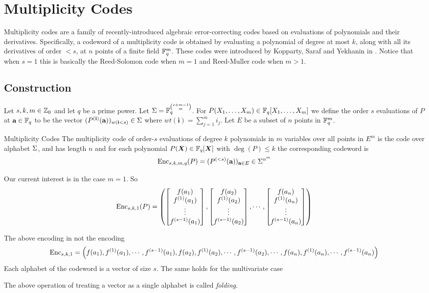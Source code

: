 \section{Multiplicity Codes}
Multiplicity codes are a family of recently-introduced algebraic error-correcting codes based on evaluations of polynomials and their derivatives. Specifically, a codeword of a multiplicity code is obtained by evaluating a polynomial of degree at most $k$, along with all its derivatives of order $<s$, at $n$ points of a finite field $\mathbb{F}_q^m$. These codes were introduced by Kopparty, Saraf and Yekhanin in \cite{KoppartySarafYekhanin_2014_Hrc}. Notice that when $s=1$ this is basically the Reed-Solomon code when $m=1$ and Reed-Muller code when $m>1$.
\subsection{Construction}
Let $s,k,m\in \mathbb{Z}_0$ and let $q$ be a prime power. Let $\Sigma= \mathbb{F}_q^{\binom{s+m-1}{m}}$. For $P(X_1,\dots, X_m)\in \mathbb{F}_q[X_1,\dots, X_m]$ we define the order $s$ evaluations of $P$ at $\textbf{a}\in \mathbb{F}_q$ to be the vector $(P^{(\textbf{i})}(\textbf{a}))_{w(\textbf{i}<s)}\in \Sigma$ where $wt(\textbf{i})=\sum\limits_{j=1}^m i_j$. Let $E$ be a subset of $n$ points in $\mathbb{F}_q^m$.  
\begin{Definition}{Multiplicity Codes}{}
    The multiplicity code of order-$s$ evaluations of degree $k$ polynomials in $m$ variables over all points in $E^m$ is the code over alphabet $\Sigma$, and has length $n$ and for each polynomial $P(\boldsymbol{X})\in \mathbb{F}_q[\boldsymbol{X}]$ with $\deg(P)\leq k$ the corresponding codeword is $$\operatorname{Enc}_{s,k,m,q}(P)=(P^{(<s)}(\textbf{a}))_{\textbf{a}\in E}\in\Sigma^{n^m}$$
\end{Definition}


Our current interest is in the case $m=1$. So $$\operatorname{Enc}_{s,k,1}(P)=\left(\left[\begin{matrix}f(a_1)\\ f^{(1)}(a_1)\\ \vdots\\ f^{(s-1)}(a_1)\end{matrix}\right],\left[\begin{matrix}f(a_2)\\ f^{(1)}(a_2)\\ \vdots\\ f^{(s-1)}(a_2)\end{matrix}\right],\cdots, \left[\begin{matrix}f(a_n)\\ f^{(1)}(a_n)\\ \vdots\\ f^{(s-1)}(a_n)\end{matrix}\right]\right)$$

\begin{remark}
    The above encoding in not the encoding $$\operatorname{Enc}_{s,k,1}=\left({f(a_1), f^{(1)}(a_1), \cdots, f^{(s-1)}(a_1)},{f(a_2), f^{(1)}(a_2), \cdots, f^{(s-1)}(a_2)},\cdots, {f(a_n), f^{(1)}(a_n), \cdots, f^{(s-1)}(a_n)}\right)$$Each alphabet of the codeword is a vector of size $s$. The same holds for the multivariate case
\end{remark}
The above operation of treating a vector as a single alphabet is called \textit{folding}. 
